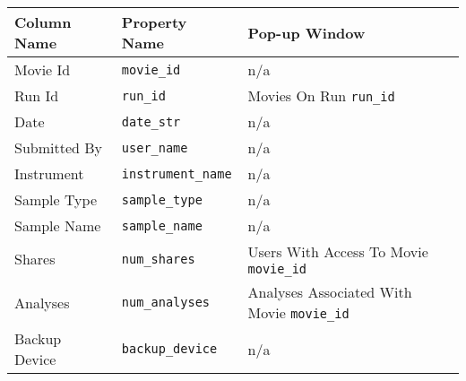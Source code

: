 \begin{tabularx}{\textwidth}{l|l|X}
\toprule
 Column Name   & Property Name   & Pop-up Window                           \\
\midrule
 Movie Id      & \texttt{movie\_id}        & n/a                                     \\
 Run Id        & \texttt{run\_id}          & Movies On Run \texttt{run\_id}                    \\
 Date          & \texttt{date\_str}        & n/a                                     \\
 Submitted By  & \texttt{user\_name}       & n/a                                     \\
 Instrument    & \texttt{instrument\_name} & n/a                                     \\
 Sample Type   & \texttt{sample\_type}     & n/a                                     \\
 Sample Name   & \texttt{sample\_name}     & n/a                                     \\
 Shares        & \texttt{num\_shares}      & Users With Access To Movie \texttt{movie\_id}     \\
 Analyses      & \texttt{num\_analyses}    & Analyses Associated With Movie \texttt{movie\_id} \\
 Backup Device & \texttt{backup\_device}   & n/a                                     \\
\bottomrule
\end{tabularx}